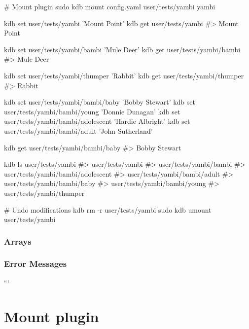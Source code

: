 \begin{DoxyCode}
# Mount plugin
sudo kdb mount config.yaml user/tests/yambi yambi

kdb set user/tests/yambi 'Mount Point'
kdb get user/tests/yambi
#> Mount Point

kdb set user/tests/yambi/bambi 'Mule Deer'
kdb get user/tests/yambi/bambi
#> Mule Deer

kdb set user/tests/yambi/thumper 'Rabbit'
kdb get user/tests/yambi/thumper
#> Rabbit

kdb set user/tests/yambi/bambi/baby 'Bobby Stewart'
kdb set user/tests/yambi/bambi/young 'Donnie Dunagan'
kdb set user/tests/yambi/bambi/adolescent 'Hardie Albright'
kdb set user/tests/yambi/bambi/adult 'John Sutherland'

kdb get user/tests/yambi/bambi/baby
#> Bobby Stewart

kdb ls user/tests/yambi
#> user/tests/yambi
#> user/tests/yambi/bambi
#> user/tests/yambi/bambi/adolescent
#> user/tests/yambi/bambi/adult
#> user/tests/yambi/bambi/baby
#> user/tests/yambi/bambi/young
#> user/tests/yambi/thumper

# Undo modifications
kdb rm -r user/tests/yambi
sudo kdb umount user/tests/yambi
\end{DoxyCode}


\subsubsection*{Arrays}




\subsubsection*{Error Messages}

``` \section*{Mount plugin}

